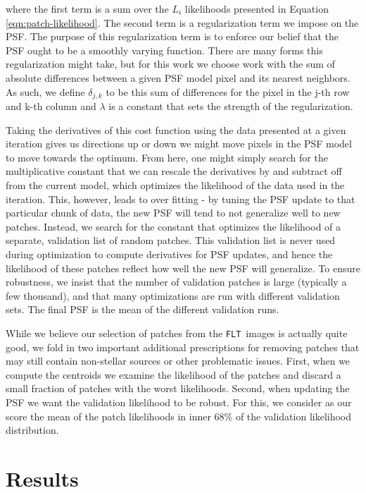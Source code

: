 \documentclass[12pt,letterpaper,preprint]{aastex}
\newcommand{\FLT}{\texttt{FLT}}
\begin{document}
\noindent where the first term is a sum over the $L_i$ likelihoods presented in Equation 
\ref{eqn:patch-likelihood}.  The second term is a regularization term we impose on the PSF.
The purpose of this regularization term is to enforce our belief that the PSF ought to be a 
smoothly varying function.  There are many forms this regularization might take, but for this 
work we choose work with the sum of absolute differences between a given PSF model pixel and its 
nearest neighbors.  As such, we define $\delta_{j, k}$ to be this sum of differences for the pixel 
in the j-th row and k-th column and $\lambda$ is a constant that sets the strength of the regularization.

Taking the derivatives of this cost function using the data presented at a given iteration 
gives us directions up or down we might move pixels in the PSF model to move towards the 
optimum.  From here, one might simply search for the multiplicative constant that we can 
rescale the derivatives by and subtract off from the current model, which optimizes the likelihood 
of the data used in the iteration.  This, however, leads to over fitting - by tuning the PSF 
update to that particular chunk of data, the new PSF will tend to not generalize well to new 
patches.  Instead, we search for the constant that optimizes the likelihood of a separate, 
validation list of random patches.  This validation list is never used during optimization to compute
derivatives for PSF updates, and hence the likelihood of these patches reflect how well the 
new PSF will generalize.  To ensure robustness, we insist that the number of validation patches 
is large (typically a few thousand), and that many optimizations are run with different validation 
sets.  The final PSF is the mean of the different validation runs.

While we believe our selection of patches from the \FLT\, images is actually quite good, we fold in 
two important additional prescriptions for removing patches that may still contain non-stellar sources 
or other problematic issues.  First, when we compute the centroids we examine the likelihood of the 
patches and discard a small fraction of patches with the worst likelihoods.  Second, when updating 
the PSF we want the validation likelihood to be robust.  For this, we consider as our score the 
mean of the patch likelihoods in inner 68\% of the validation likelihood distribution.


\section{Results}
\end{document}
